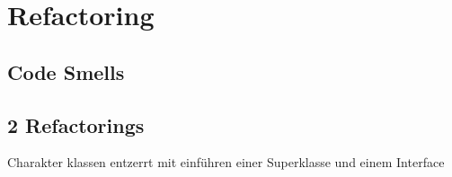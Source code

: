 \chapter{Refactoring}

\section{Code Smells}

\section{2 Refactorings}

Charakter klassen entzerrt mit einführen einer Superklasse und einem Interface 